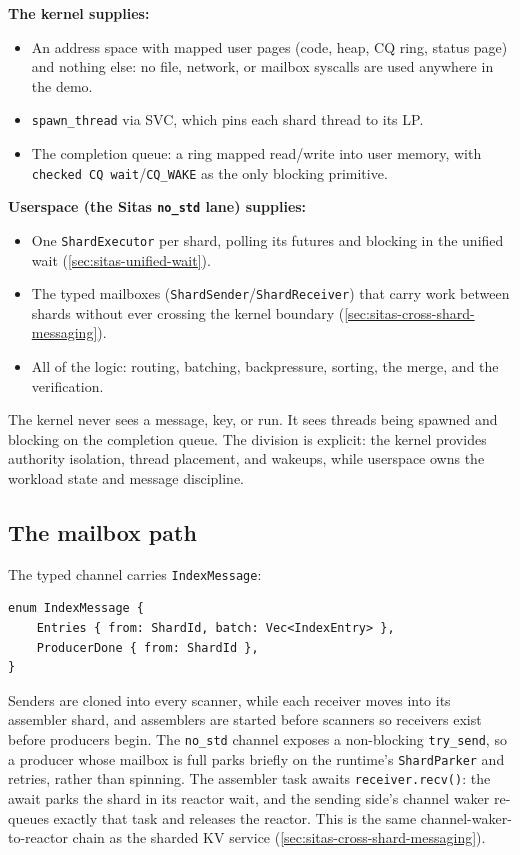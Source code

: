 \textbf{The kernel supplies:}

\begin{itemize}
    \item An address space with mapped user pages (code, heap, CQ ring,
        status page) and nothing else: no file, network, or mailbox
        syscalls are used anywhere in the demo.
    \item \texttt{spawn\_thread} via SVC, which pins each shard thread to
        its LP.
    \item The completion queue: a ring mapped read/write into user memory,
        with \texttt{checked CQ wait}/\texttt{CQ\_WAKE} as the only blocking
        primitive.
\end{itemize}

\textbf{Userspace (the Sitas \texttt{no\_std} lane) supplies:}

\begin{itemize}
    \item One \texttt{ShardExecutor} per shard, polling its futures and
        blocking in the unified wait (\autoref{sec:sitas-unified-wait}).
    \item The typed mailboxes (\texttt{ShardSender}/\texttt{ShardReceiver})
        that carry work between shards without ever crossing the kernel
        boundary (\autoref{sec:sitas-cross-shard-messaging}).
    \item All of the logic: routing, batching, backpressure, sorting, the
        merge, and the verification.
\end{itemize}

The kernel never sees a message, key, or run. It sees threads being spawned and
blocking on the completion queue. The division is explicit: the kernel provides
authority isolation, thread placement, and wakeups, while userspace owns the workload
state and message discipline.

\subsection{The mailbox path}

The typed channel carries \texttt{IndexMessage}:

\begin{lstlisting}[style=rustCode]
enum IndexMessage {
    Entries { from: ShardId, batch: Vec<IndexEntry> },
    ProducerDone { from: ShardId },
}
\end{lstlisting}

Senders are cloned into every scanner, while each receiver moves into its
assembler shard, and assemblers are started before scanners so receivers
exist before producers begin. The \texttt{no\_std} channel exposes a
non-blocking \texttt{try\_send}, so a producer whose mailbox is full parks
briefly on the runtime's \texttt{ShardParker} and retries, rather than
spinning. The assembler task awaits \texttt{receiver.recv()}: the await
parks the shard in its reactor wait, and the sending side's channel waker
re-queues exactly that task and releases the reactor. This is the same
channel-waker-to-reactor chain as the sharded KV service
(\autoref{sec:sitas-cross-shard-messaging}).


